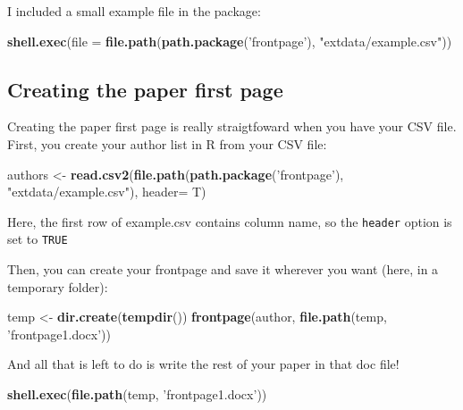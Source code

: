 \documentclass[]{article}
\newenvironment{Shaded}{\begin{snugshade}}{\end{snugshade}}
\newcommand{\KeywordTok}[1]{\textcolor[rgb]{0.13,0.29,0.53}{\textbf{#1}}}
\newcommand{\DataTypeTok}[1]{\textcolor[rgb]{0.13,0.29,0.53}{#1}}
\newcommand{\StringTok}[1]{\textcolor[rgb]{0.31,0.60,0.02}{#1}}
\newcommand{\NormalTok}[1]{#1}
\begin{document}
I included a small example file in the package:

\begin{Shaded}
\begin{Highlighting}[]
\KeywordTok{shell.exec}\NormalTok{(}\DataTypeTok{file =} \KeywordTok{file.path}\NormalTok{(}\KeywordTok{path.package}\NormalTok{(}\StringTok{'frontpage'}\NormalTok{), }\StringTok{"extdata/example.csv"}\NormalTok{))}
\end{Highlighting}
\end{Shaded}

\subsection{Creating the paper first
page}\label{creating-the-paper-first-page}

Creating the paper first page is really straigtfoward when you have your
CSV file. First, you create your author list in R from your CSV file:

\begin{Shaded}
\begin{Highlighting}[]
\NormalTok{authors <-}\StringTok{ }\KeywordTok{read.csv2}\NormalTok{(}\KeywordTok{file.path}\NormalTok{(}\KeywordTok{path.package}\NormalTok{(}\StringTok{'frontpage'}\NormalTok{), }\StringTok{"extdata/example.csv"}\NormalTok{), }\DataTypeTok{header=}\NormalTok{ T)}
\end{Highlighting}
\end{Shaded}

Here, the first row of example.csv contains column name, so the
\texttt{header} option is set to \texttt{TRUE}

Then, you can create your frontpage and save it wherever you want (here,
in a temporary folder):

\begin{Shaded}
\begin{Highlighting}[]
\NormalTok{temp <-}\StringTok{ }\KeywordTok{dir.create}\NormalTok{(}\KeywordTok{tempdir}\NormalTok{())}
\KeywordTok{frontpage}\NormalTok{(author, }\KeywordTok{file.path}\NormalTok{(temp, }\StringTok{'frontpage1.docx'}\NormalTok{))}
\end{Highlighting}
\end{Shaded}

And all that is left to do is write the rest of your paper in that doc
file!

\begin{Shaded}
\begin{Highlighting}[]
\KeywordTok{shell.exec}\NormalTok{(}\KeywordTok{file.path}\NormalTok{(temp, }\StringTok{'frontpage1.docx'}\NormalTok{))}
\end{Highlighting}
\end{Shaded}
\end{document}
